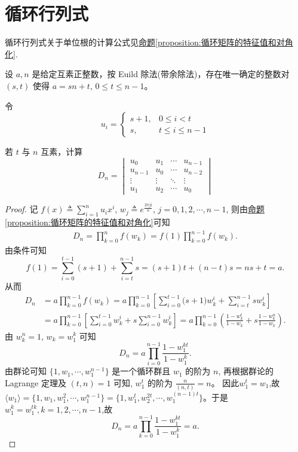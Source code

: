 \documentclass[../../main.tex]{subfiles}%
\begin{document}
\section{循环行列式}

循环行列式关于单位根的计算公式见\hyperref[proposition:循环矩阵的特征值和对角化]{命题\ref{proposition:循环矩阵的特征值和对角化}}.

\begin{example}
设 $a, n$ 是给定互素正整数，按 Euild 除法(带余除法)，存在唯一确定的整数对 $(s, t)$ 使得 $a = sn + t$, $0 \leqslant  t \leqslant  n - 1$。

令
\[u_i = 
\begin{cases} 
s + 1, & 0 \leqslant  i < t \\
s, & t \leqslant  i \leqslant  n - 1 
\end{cases}\]

若 $t$ 与 $n$ 互素，计算
\[D_n =
\begin{vmatrix}
u_0 & u_1 & \cdots & u_{n-1} \\
u_{n-1} & u_0 & \cdots & u_{n-2} \\
\vdots & \vdots & \ddots & \vdots \\
u_1 & u_2 & \cdots & u_0
\end{vmatrix}\]
\end{example}
\begin{proof}
记 $f(x) \triangleq \sum_{i=1}^n u_i x^i$, $w_j \triangleq e^{\frac{2\pi j \mathrm{i} }{n}}$, $j=0,1,2,\cdots,n-1$, 则由\hyperref[proposition:循环矩阵的特征值和对角化]{命题\ref{proposition:循环矩阵的特征值和对角化}}可知
\begin{align*}
D_n=\prod_{k=0}^n{f\left( w_k \right)}=f\left( 1 \right) \prod_{k=0}^{n-1}{f\left( w_k \right)}.
\end{align*}
由条件可知
\[
f(1) = \sum_{i=0}^{t-1} (s+1) + \sum_{i=t}^{n-1} s = (s+1)t + (n-t)s = ns + t = a.
\]
从而
\begin{align*}
D_n&=a\prod_{k=0}^{n-1}{f(w_k)}=a\prod_{k=0}^{n-1}{\left[ \sum_{i=0}^{t-1}{(s}+1)w_{k}^{i}+\sum_{i=t}^{n-1}{sw_{k}^{i}} \right]}
\\
&=a\prod_{k=0}^{n-1}{\left[ \sum_{i=0}^{t-1}{w_{k}^{i}}+s\sum_{i=0}^{n-1}{w_{k}^{i}} \right]}=a\prod_{k=0}^{n-1}{\left( \frac{1-w_{k}^{t}}{1-w_k}+s\frac{1-w_{k}^{n}}{1-w_k} \right)}.
\end{align*}
由 $w_{k}^{n} = 1$, $w_k = w_{1}^{k}$ 可知
\[
D_n = a \prod_{i=0}^{n-1} \frac{1-w_{1}^{kt}}{1-w_{1}^{k}}.
\]
由群论可知 $\{1, w_1, \cdots, w_{1}^{n-1}\}$ 是一个循环群且 $w_1$ 的阶为 $n$, 再根据群论的 Lagrange 定理及 $(t, n) = 1$ 可知, $w_{1}^{t}$ 的阶为 $\frac{n}{(n,t)} = n$。  
因此$w_1^t=w_1$,故$\langle w_1 \rangle=\{1,w_1, w_{1}^{2}, \cdots, w_{1}^{n-1}\} = \{1,w_{1}^{t}, w_{2}^{2t}, \cdots, w_{1}^{(n-1)t}\}$。于是 $w_{1}^{k} = w_{1}^{tk},k=1,2,\cdots,n-1$,故
\[
D_n = a \prod_{k=0}^{n-1} \frac{1-w_{1}^{kt}}{1-w_{1}^{k}} = a.
\]
\end{proof}
\end{document}
